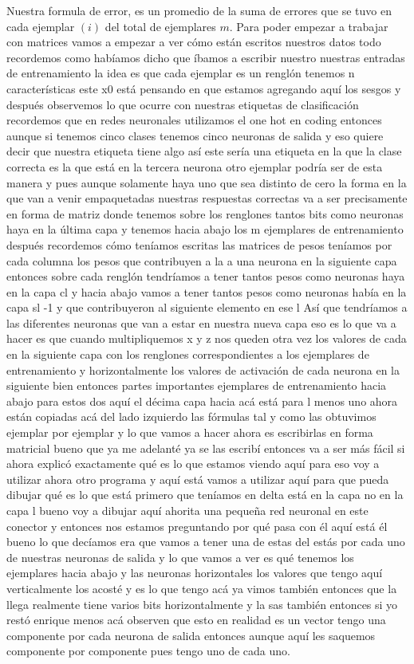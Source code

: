 Nuestra formula de error, es un promedio de la suma de errores que se tuvo en cada ejemplar $(i)$ del total de ejemplares $m$.
Para poder empezar a trabajar con matrices vamos a empezar a ver cómo están escritos nuestros datos todo recordemos como habíamos dicho que íbamos a escribir nuestro nuestras entradas de entrenamiento la idea es que cada ejemplar es un renglón tenemos n características este x0 está pensando en que estamos agregando aquí los sesgos y después observemos lo que ocurre con nuestras etiquetas de clasificación recordemos que en redes neuronales utilizamos el one hot en coding entonces aunque si tenemos cinco clases tenemos cinco neuronas de salida y eso quiere decir que nuestra etiqueta tiene algo así este sería una etiqueta en la que la clase correcta es la que está en la tercera neurona otro ejemplar podría ser de esta manera y pues aunque solamente haya uno que sea distinto de cero la forma en la que van a venir empaquetadas nuestras respuestas correctas va a ser precisamente en forma de matriz donde tenemos sobre los renglones tantos bits como neuronas haya en la última capa y tenemos hacia abajo los m ejemplares de entrenamiento después recordemos cómo teníamos escritas las matrices de pesos teníamos por cada columna los pesos que contribuyen a la a una neurona en la siguiente capa entonces sobre cada renglón tendríamos a tener tantos pesos como neuronas haya en la capa cl y hacia abajo vamos a tener tantos pesos como neuronas había en la capa sl -1 y que contribuyeron al siguiente elemento en ese l 
Así que tendríamos a las diferentes neuronas que van a estar en nuestra nueva capa eso es lo que va a hacer es que cuando multipliquemos x y z nos queden otra vez los valores de cada en la siguiente capa con los renglones correspondientes a los ejemplares de entrenamiento y horizontalmente los valores de activación de cada neurona en la siguiente bien entonces partes importantes ejemplares de entrenamiento hacia abajo para estos dos aquí el décima capa hacia acá está para l menos uno ahora están copiadas acá del lado izquierdo las fórmulas tal y como las obtuvimos ejemplar por ejemplar y lo que vamos a hacer ahora es escribirlas en forma matricial bueno que ya me adelanté ya se las escribí entonces va a ser más fácil si ahora explicó exactamente qué es lo que estamos viendo aquí para eso voy a utilizar ahora otro programa y aquí está vamos a utilizar aquí para que pueda dibujar qué es lo que está primero que teníamos en delta está en la capa no en la capa l bueno voy a dibujar aquí ahorita una pequeña red neuronal en este conector y entonces nos estamos preguntando por qué pasa con él aquí está él bueno lo que decíamos era que vamos a tener una de estas del estás por cada uno de nuestras neuronas de salida y lo que vamos a ver es qué tenemos los ejemplares hacia abajo y las neuronas horizontales los valores que tengo aquí verticalmente los acosté y es lo que tengo acá ya vimos también entonces que la llega realmente tiene varios bits horizontalmente y la sas también entonces si yo restó enrique menos acá observen que esto en realidad es un vector tengo una componente por cada neurona de salida entonces aunque aquí les saquemos componente por componente pues tengo uno de cada uno. 
